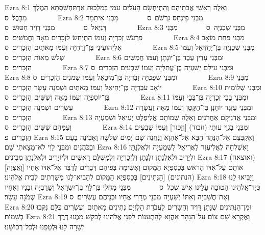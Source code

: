 Ezra 8:1	וְאֵלֶּה רָאשֵׁי אֲבֹתֵיהֶם וְהִתְיַחְשָׂם הָעֹלִים עִמִּי בְּמַלְכוּת אַרְתַּחְשַׁסְתְּא הַמֶּלֶךְ מִבָּבֶל׃ {ס}        
Ezra 8:2	מִבְּנֵי פִינְחָס גֵּרְשֹׁם {ס}        מִבְּנֵי אִיתָמָר דָּנִיֵּאל {ס}        מִבְּנֵי דָוִיד חַטּוּשׁ׃ {ס}        
Ezra 8:3	מִבְּנֵי שְׁכַנְיָה {ס}        מִבְּנֵי פַרְעֹשׁ זְכַרְיָה וְעִמּוֹ הִתְיַחֵשׂ לִזְכָרִים מֵאָה וַחֲמִשִּׁים׃ {ס}        
Ezra 8:4	מִבְּנֵי פַּחַת מוֹאָב אֶלְיְהוֹעֵינַי בֶּן־זְרַחְיָה וְעִמּוֹ מָאתַיִם הַזְּכָרִים׃ {ס}        
Ezra 8:5	מִבְּנֵי שְׁכַנְיָה בֶּן־יַחֲזִיאֵל וְעִמּוֹ שְׁלֹשׁ מֵאוֹת הַזְּכָרִים׃ {ס}        
Ezra 8:6	וּמִבְּנֵי עָדִין עֶבֶד בֶּן־יוֹנָתָן וְעִמּוֹ חֲמִשִּׁים הַזְּכָרִים׃ {ס}        
Ezra 8:7	וּמִבְּנֵי עֵילָם יְשַׁעְיָה בֶּן־עֲתַלְיָה וְעִמּוֹ שִׁבְעִים הַזְּכָרִים׃ {ס}        
Ezra 8:8	וּמִבְּנֵי שְׁפַטְיָה זְבַדְיָה בֶּן־מִיכָאֵל וְעִמּוֹ שְׁמֹנִים הַזְּכָרִים׃ {ס}        
Ezra 8:9	מִבְּנֵי יוֹאָב עֹבַדְיָה בֶּן־יְחִיאֵל וְעִמּוֹ מָאתַיִם וּשְׁמֹנָה עָשָׂר הַזְּכָרִים׃ {ס}        
Ezra 8:10	וּמִבְּנֵי שְׁלוֹמִית בֶּן־יוֹסִפְיָה וְעִמּוֹ מֵאָה וְשִׁשִּׁים הַזְּכָרִים׃ {ס}        
Ezra 8:11	וּמִבְּנֵי בֵבַי זְכַרְיָה בֶּן־בֵּבָי וְעִמּוֹ עֶשְׂרִים וּשְׁמֹנָה הַזְּכָרִים׃ {ס}        
Ezra 8:12	וּמִבְּנֵי עַזְגָּד יוֹחָנָן בֶּן־הַקָּטָן וְעִמּוֹ מֵאָה וַעֲשָׂרָה הַזְּכָרִים׃ {ס}        
Ezra 8:13	וּמִבְּנֵי אֲדֹנִיקָם אַחֲרֹנִים וְאֵלֶּה שְׁמוֹתָם אֱלִיפֶלֶט יְעִיאֵל וּשְׁמַעְיָה וְעִמָּהֶם שִׁשִּׁים הַזְּכָרִים׃ {ס}        
Ezra 8:14	וּמִבְּנֵי בִגְוַי עוּתַי (וזבוד) [וְזַכּוּר] וְעִמּוֹ שִׁבְעִים הַזְּכָרִים׃ {פ}
Ezra 8:15	וָאֶקְבְּצֵם אֶל־הַנָּהָר הַבָּא אֶל־אַהֲוָא וַנַּחֲנֶה שָׁם יָמִים שְׁלֹשָׁה וָאָבִינָה בָעָם וּבַכֹּהֲנִים וּמִבְּנֵי לֵוִי לֹא־מָצָאתִי שָׁם׃
Ezra 8:16	וָאֶשְׁלְחָה לֶאֱלִיעֶזֶר לַאֲרִיאֵל לִשְׁמַעְיָה וּלְאֶלְנָתָן וּלְיָרִיב וּלְאֶלְנָתָן וּלְנָתָן וְלִזְכַרְיָה וְלִמְשֻׁלָּם רָאשִׁים וּלְיוֹיָרִיב וּלְאֶלְנָתָן מְבִינִים׃
Ezra 8:17	(ואוצאה) [וָאֲצַוֶּה] אוֹתָם עַל־אִדּוֹ הָרֹאשׁ בְּכָסִפְיָא הַמָּקוֹם וָאָשִׂימָה בְּפִיהֶם דְּבָרִים לְדַבֵּר אֶל־אִדּוֹ אָחִיו (הנתונים) [הַנְּתִינִים] בְּכָסִפְיָא הַמָּקוֹם לְהָבִיא־לָנוּ מְשָׁרְתִים לְבֵית אֱלֹהֵינוּ׃
Ezra 8:18	וַיָּבִיאּוּ לָנוּ כְּיַד־אֱלֹהֵינוּ הַטּוֹבָה עָלֵינוּ אִישׁ שֶׂכֶל {ס}        מִבְּנֵי מַחְלִי בֶּן־לֵוִי בֶּן־יִשְׂרָאֵל וְשֵׁרֵבְיָה וּבָנָיו וְאֶחָיו שְׁמֹנָה עָשָׂר׃
Ezra 8:19	וְאֶת־חֲשַׁבְיָה וְאִתּוֹ יְשַׁעְיָה מִבְּנֵי מְרָרִי אֶחָיו וּבְנֵיהֶם עֶשְׂרִים׃ {ס}        
Ezra 8:20	וּמִן־הַנְּתִינִים שֶׁנָּתַן דָּוִיד וְהַשָּׂרִים לַעֲבֹדַת הַלְוִיִּם נְתִינִים מָאתַיִם וְעֶשְׂרִים כֻּלָּם נִקְּבוּ בְשֵׁמוֹת׃
Ezra 8:21	וָאֶקְרָא שָׁם צוֹם עַל־הַנָּהָר אַהֲוָא לְהִתְעַנּוֹת לִפְנֵי אֱלֹהֵינוּ לְבַקֵּשׁ מִמֶּנּוּ דֶּרֶךְ יְשָׁרָה לָנוּ וּלְטַפֵּנוּ וּלְכל־רְכוּשֵׁנוּ׃
